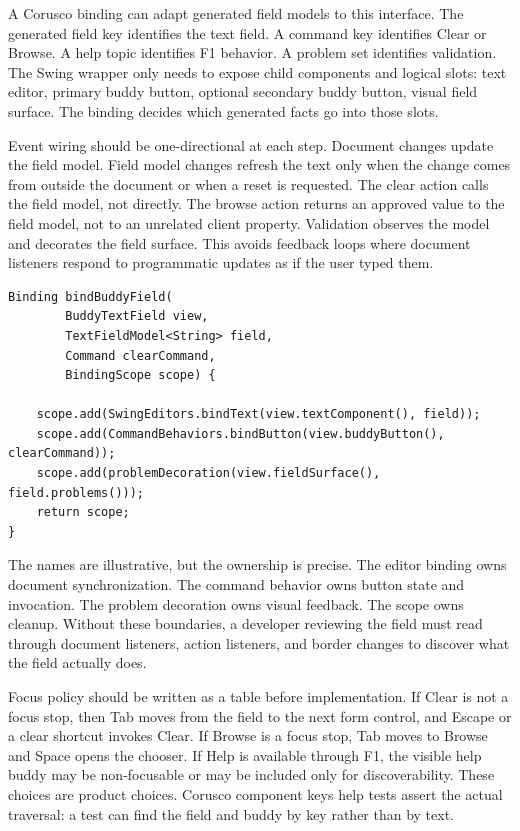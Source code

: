 A Corusco binding can adapt generated field models to this interface. The generated
field key identifies the text field. A command key identifies Clear or Browse. A help
topic identifies F1 behavior. A problem set identifies validation. The Swing wrapper
only needs to expose child components and logical slots: text editor, primary buddy
button, optional secondary buddy button, visual field surface. The binding decides which
generated facts go into those slots.

Event wiring should be one-directional at each step. Document changes update the field
model. Field model changes refresh the text only when the change comes from outside the
document or when a reset is requested. The clear action calls the field model, not
 directly. The
browse action returns an approved value to the field model, not to an unrelated client
property. Validation observes the model and decorates the field surface. This avoids
feedback loops where document listeners respond to programmatic updates as if the user
typed them.

\begin{lstlisting}[caption={Buddy field wiring keeps commands behind the model.}]
Binding bindBuddyField(
        BuddyTextField view,
        TextFieldModel<String> field,
        Command clearCommand,
        BindingScope scope) {

    scope.add(SwingEditors.bindText(view.textComponent(), field));
    scope.add(CommandBehaviors.bindButton(view.buddyButton(), clearCommand));
    scope.add(problemDecoration(view.fieldSurface(), field.problems()));
    return scope;
}
\end{lstlisting}

The names are illustrative, but the ownership is precise. The editor binding owns
document synchronization. The command behavior owns button state and invocation. The
problem decoration owns visual feedback. The scope owns cleanup. Without these
boundaries, a developer reviewing the field must read through document listeners, action
listeners, and border changes to discover what the field actually does.

Focus policy should be written as a table before implementation. If Clear is not a focus
stop, then Tab moves from the field to the next form control, and Escape or a clear
shortcut invokes Clear. If Browse is a focus stop, Tab moves to Browse and Space opens
the chooser. If Help is available through F1, the visible help buddy may be
non-focusable or may be included only for discoverability. These choices are product
choices. Corusco component keys help tests assert the actual traversal: a test can find
the field and buddy by key rather than by text.

